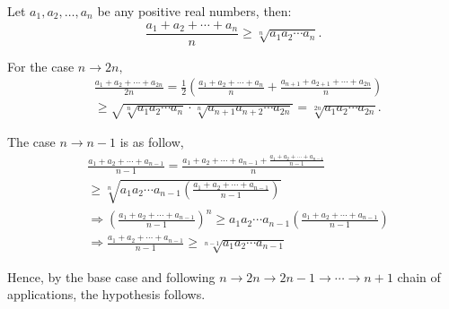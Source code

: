 \documentclass{article}
\begin{document}
\begin{problem}
    Let $a_1, a_2, \ldots, a_n$ be any positive real numbers, then:
    \[
        \frac{a_1+a_2+\cdots+a_n}{n} \ge \sqrt[n]{a_1a_2 \cdots a_n}.
    \]
\end{problem}

\begin{soln}
    For the case $n \rightarrow 2n,$
    \[
        \begin{aligned}
            &\frac{a_1 + a_2 + \cdots + a_{2n}}{2n} = \frac{1}{2} \left( \frac{a_1+a_2+\cdots+a_n}{n} + \frac{a_{n+1}+a_{2+1}+\cdots+a_{2n}}{n} \right)\\
            &\ge \sqrt{\sqrt[n]{a_1 a_2 \cdots a_n} \cdot \sqrt[n]{a_{n+1} a_{n+2} \cdots a_{2n}}} = \sqrt[2n]{a_1 a_2 \cdots a_{2n}}.
        \end{aligned}
    \]

    The case $n \rightarrow n-1$ is as follow,
    \[
        \begin{aligned}
            &\frac{a_1+a_2+\cdots+a_{n-1}}{n-1} = \frac{a_1+a_2+\cdots+a_{n-1} + \frac{a_1+a_2+\cdots+a_{n-1}}{n-1}}{n}\\
            &\ge \sqrt[n]{a_1 a_2 \cdots a_{n-1} \left(\frac{a_1+a_2+\cdots+a_{n-1}}{n-1}\right)}\\
            &\Rightarrow \left( \frac{a_1+a_2+\cdots+a_{n-1}}{n-1} \right)^n \ge a_1 a_2 \cdots a_{n-1} \left(\frac{a_1+a_2+\cdots+a_{n-1}}{n-1}\right)\\
            &\Rightarrow \frac{a_1+a_2+\cdots+a_{n-1}}{n-1} \ge \sqrt[n-1]{a_1 a_2 \cdots a_{n-1}}
        \end{aligned}
    \]

    Hence, by the base case and following $n \rightarrow 2n \rightarrow 2n-1 \rightarrow \cdots \rightarrow n+1$ chain of applications, the hypothesis follows.
\end{soln}
\end{document}
